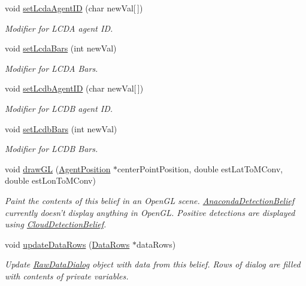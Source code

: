 \begin{DoxyCompactItemize}
void \hyperlink{class_anaconda_detection_belief_a21f5b543fbbae67acf12af7c1c99f2cc}{setLcdaAgentID} (char newVal\mbox{[}$\,$\mbox{]})
\begin{DoxyCompactList}\small\item\em Modifier for LCDA agent ID. \end{DoxyCompactList}\item 
void \hyperlink{class_anaconda_detection_belief_a94a2292287a1cf0d19e4b036ba6fe4f0}{setLcdaBars} (int newVal)
\begin{DoxyCompactList}\small\item\em Modifier for LCDA Bars. \end{DoxyCompactList}\item 
void \hyperlink{class_anaconda_detection_belief_a1161e709a9d4950c66de8a42667aac0a}{setLcdbAgentID} (char newVal\mbox{[}$\,$\mbox{]})
\begin{DoxyCompactList}\small\item\em Modifier for LCDB agent ID. \end{DoxyCompactList}\item 
void \hyperlink{class_anaconda_detection_belief_afcd45d9ef7138817faf4739a39a5253a}{setLcdbBars} (int newVal)
\begin{DoxyCompactList}\small\item\em Modifier for LCDB Bars. \end{DoxyCompactList}\item 
void \hyperlink{class_anaconda_detection_belief_ad708581488abdb968a9412d955ca9b8f}{drawGL} (\hyperlink{class_agent_position}{AgentPosition} $\ast$centerPointPosition, double estLatToMConv, double estLonToMConv)
\begin{DoxyCompactList}\small\item\em Paint the contents of this belief in an OpenGL scene. \hyperlink{class_anaconda_detection_belief}{AnacondaDetectionBelief} currently doesn't display anything in OpenGL. Positive detections are displayed using \hyperlink{class_cloud_detection_belief}{CloudDetectionBelief}. \end{DoxyCompactList}\item 
void \hyperlink{class_anaconda_detection_belief_a5e9699b6543d9cc1cd4fbfbecb6ea8f9}{updateDataRows} (\hyperlink{struct_data_rows}{DataRows} $\ast$dataRows)
\begin{DoxyCompactList}\small\item\em Update \hyperlink{class_raw_data_dialog}{RawDataDialog} object with data from this belief. Rows of dialog are filled with contents of private variables. \end{DoxyCompactList}\end{DoxyCompactItemize}
